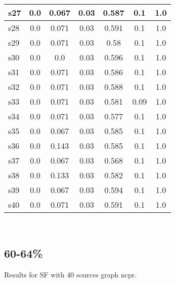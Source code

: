 \documentclass{article}
\begin{document}
\begin{tabular}{|l|c|c|c|c|c|c|}
\hline
s27 &0.0 & 0.067 & 0.03 & 0.587 & 0.1 & 1.0\\
\hline
s28 &0.0 & 0.071 & 0.03 & 0.591 & 0.1 & 1.0\\
\hline
s29 &0.0 & 0.071 & 0.03 & 0.58 & 0.1 & 1.0\\
\hline
s30 &0.0 & 0.0 & 0.03 & 0.596 & 0.1 & 1.0\\
\hline
s31 &0.0 & 0.071 & 0.03 & 0.586 & 0.1 & 1.0\\
\hline
s32 &0.0 & 0.071 & 0.03 & 0.588 & 0.1 & 1.0\\
\hline
s33 &0.0 & 0.071 & 0.03 & 0.581 & 0.09 & 1.0\\
\hline
s34 &0.0 & 0.071 & 0.03 & 0.577 & 0.1 & 1.0\\
\hline
s35 &0.0 & 0.067 & 0.03 & 0.585 & 0.1 & 1.0\\
\hline
s36 &0.0 & 0.143 & 0.03 & 0.585 & 0.1 & 1.0\\
\hline
s37 &0.0 & 0.067 & 0.03 & 0.568 & 0.1 & 1.0\\
\hline
s38 &0.0 & 0.133 & 0.03 & 0.582 & 0.1 & 1.0\\
\hline
s39 &0.0 & 0.067 & 0.03 & 0.594 & 0.1 & 1.0\\
\hline
s40 &0.0 & 0.071 & 0.03 & 0.591 & 0.1 & 1.0\\
\hline
\end{tabular}\\

\newpage

\subsection{60-64\%}

\noindent Results for SF with 40 sources graph ncpr.
\end{document}
